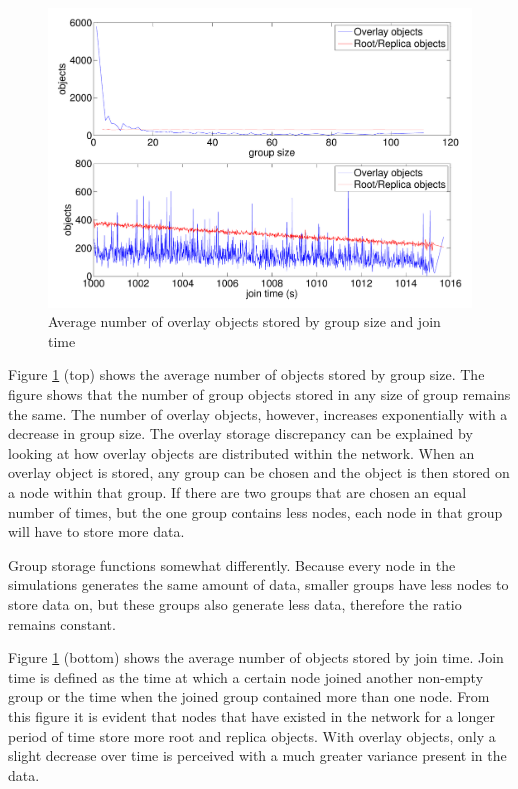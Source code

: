 \documentclass[10pt,a4paper,conference]{IEEEtran}
\begin{document}
%
\begin{figure}[htbp]
 \centering
 \includegraphics[clip=true, viewport=0.5cm 0.5cm 29cm 20.5cm, width=\columnwidth]{ObjectsByJtGs}
 \caption{Average number of overlay objects stored by group size and join time}
 \label{fig_objects_by_groupsize_jointime}
\end{figure}
%
Figure \ref{fig_objects_by_groupsize_jointime} (top) shows the average number of objects stored by group size. The figure shows that the number of
group objects stored in any size of group remains the same. The number of overlay objects, however, increases exponentially with a decrease in group
size. The overlay storage discrepancy can be explained by looking at how overlay objects are distributed within the network. When an overlay object
is stored, any group can be chosen and the object is then stored on a node within that group. If there are two groups that are chosen an equal number
of times, but the one group contains less nodes, each node in that group will have to store more data.

Group storage functions somewhat differently. Because every node in the simulations generates the same amount of data, smaller groups have less nodes
to store data on, but these groups also generate less data, therefore the ratio remains constant.

%
Figure \ref{fig_objects_by_groupsize_jointime} (bottom) shows the average number of objects stored by join time. Join time is defined as the time at
which a certain node joined another non-empty group or the time when the joined group contained more than one node. From this figure it is evident
that nodes that have existed in the network for a longer period of time store more root and replica objects. With overlay objects, only a slight
decrease over time is perceived with a much greater variance present in the data.
\end{document}
